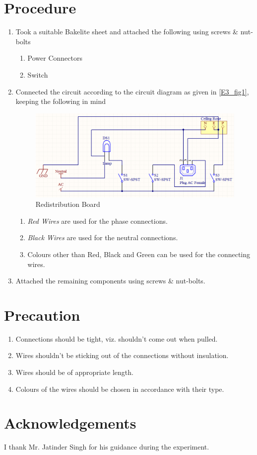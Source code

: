 \section{Procedure}
	\begin{enumerate}
		\item Took a suitable Bakelite sheet and attached the following using screws \& nut-bolts
			\begin{enumerate}
				\item Power Connectors
				\item Switch
			\end{enumerate} 
		\item Connected the circuit according to the circuit diagram as given in \autoref{E3_fig1}, keeping the following in mind
		\begin{figure}[bth]
			\begin{center}
				\includegraphics[width=1.2\linewidth]{gfx/circuit3}
			\end{center}
		\caption[Redistribution Board]{Redistribution Board}\label{E3_fig1}
		\end{figure}

			\begin{enumerate}
				\item \emph{Red Wires} are used for the phase connections.
				\item \emph{Black Wires} are used for the neutral connections.
				\item Colours other than Red, Black and Green can be used for the connecting wires.
			\end{enumerate}	
		\item Attached the remaining components using screws \& nut-bolts.
	\end{enumerate}
\section{Precaution}
	\begin{enumerate}
		\item Connections should be tight, viz. shouldn't come out when pulled.
		\item Wires shouldn't be sticking out of the connections without insulation.
		\item Wires should be of appropriate length.
		\item Colours of the wires should be chosen in accordance with their type.
	\end{enumerate}	
\section{Acknowledgements}
I thank Mr. Jatinder Singh for his guidance during the experiment.